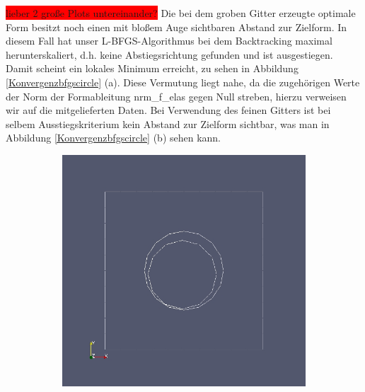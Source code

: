 \colorbox{red}{lieber 2 große Plots untereinander?}
Die bei dem groben Gitter erzeugte optimale Form besitzt noch einen mit bloßem Auge sichtbaren Abstand zur Zielform. In diesem Fall hat unser L-BFGS-Algorithmus bei dem Backtracking maximal herunterskaliert, d.h. keine Abstiegsrichtung gefunden und ist ausgestiegen. Damit scheint ein lokales Minimum erreicht, zu sehen in Abbildung  \ref{Konvergenzbfgscircle} (a). Diese Vermutung liegt nahe, da die zugehörigen Werte der Norm der Formableitung \textsf{nrm\_f\_elas} gegen Null streben, hierzu verweisen wir auf die mitgelieferten Daten. Bei Verwendung des feinen Gitters ist bei selbem Ausstiegskriterium kein Abstand zur Zielform sichtbar, was man in Abbildung \ref{Konvergenzbfgscircle} (b) sehen kann.

\begin{figure}
	\begin{subfigure}{0.5\textwidth}
	\centering
	\includegraphics[scale=0.25]{pic_bigcircle_bfgs_linesearch.jpg}
	\caption{}	
	\end{subfigure}
	\begin{subfigure}{0.5\textwidth}
	\centering

\end{subfigure}
\end{figure}
